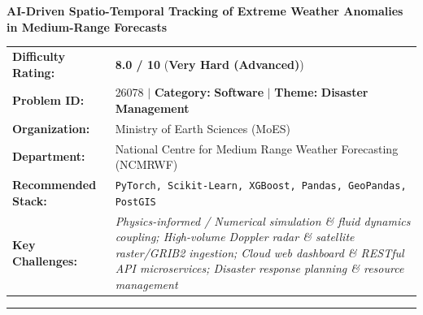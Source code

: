 \documentclass[10pt,a4paper]{article}
\begin{document}
\begin{tcolorbox}[pscard, title={"\textbf{SIH26078} \quad $\vert$ \quad AI-Driven Spatio-Temporal Tracking of Extreme Weather Anomalies in Medium-R...}]
\textbf{\large AI-Driven Spatio-Temporal Tracking of Extreme Weather Anomalies in Medium-Range Forecasts}\\[0.25cm]

\begin{tabular}{@{}lp{12.5cm}@{}}
\textbf{Difficulty Rating:} & \textcolor{diffveryhard}{\textbf{\Large 8.0 / 10}} \quad (\textbf{Very Hard (Advanced)}) \\
\textbf{Problem ID:} & 26078 \quad $\vert$ \quad \textbf{Category:} \textbf{Software} \quad $\vert$ \quad \textbf{Theme:} \textbf{Disaster Management} \\
\textbf{Organization:} & Ministry of Earth Sciences (MoES) \\
\textbf{Department:} & National Centre for Medium Range Weather Forecasting (NCMRWF) \\
\textbf{Recommended Stack:} & \texttt{PyTorch, Scikit-Learn, XGBoost, Pandas, GeoPandas, PostGIS} \\
\textbf{Key Challenges:} & \textit{\small Physics-informed / Numerical simulation \& fluid dynamics coupling; High-volume Doppler radar \& satellite raster/GRIB2 ingestion; Cloud web dashboard \& RESTful API microservices; Disaster response planning \& resource management} \\
\end{tabular}

\vspace{0.2cm}
\hrule
\vspace{0.2cm}


\end{tcolorbox}
\end{document}
